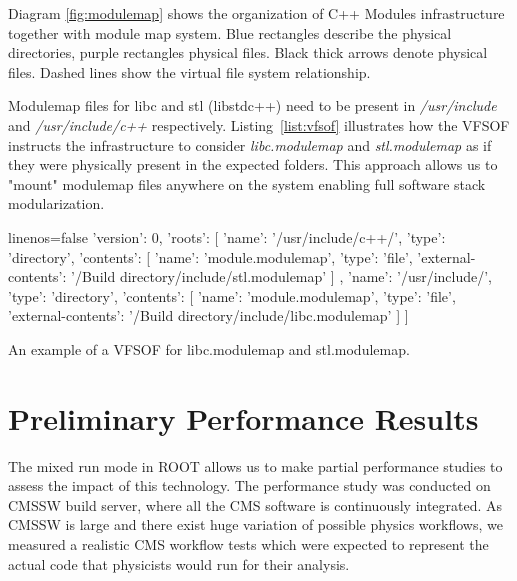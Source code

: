 \documentclass[12pt]{iopart}
\begin{document}
Diagram \ref{fig:modulemap} shows the organization of C++ Modules infrastructure together with module map system. Blue rectangles describe the physical directories, purple rectangles physical files. Black thick arrows denote physical files. Dashed lines show the virtual file system relationship.

Modulemap files for libc and stl (libstdc++) need to be present in \textit{/usr/include} and \textit{/usr/include/c++} respectively. Listing~\ref{list:vfsof} illustrates how the VFSOF instructs the infrastructure to consider \textit{libc.modulemap} and \textit{stl.modulemap} as if they were physically present in the expected folders. This approach allows us to "mount" modulemap files anywhere on the system enabling full software stack modularization.

\begin{listing}[h]
\noindent
\begin{minipage}[h]{\textwidth}
\begin{cppcode*}{linenos=false}
{
  'version': 0,
  'roots': [
    { 'name': '/usr/include/c++/', 'type': 'directory',
      'contents': [
        { 'name': 'module.modulemap', 'type': 'file',
          'external-contents': '/Build directory/include/stl.modulemap'
        }
      ]
    },
    { 'name': '/usr/include/', 'type': 'directory',
      'contents': [
        { 'name': 'module.modulemap', 'type': 'file',
          'external-contents': '/Build directory/include/libc.modulemap'
        }
      ]
    }
  ]
}
\end{cppcode*}
\end{minipage}
\caption{An example of a VFSOF for libc.modulemap and stl.modulemap.}
\label{list:vfsof}
\end{listing}




\section{Preliminary Performance Results}
\label{results}

The mixed run mode in ROOT allows us to make partial performance studies to assess the impact of this technology. The performance study was conducted on CMSSW build server, where all the CMS software is continuously integrated. As CMSSW is large and there exist huge variation of possible physics workflows, we measured a realistic CMS workflow tests which were expected to represent the actual code that physicists would run for their analysis.
\end{document}
